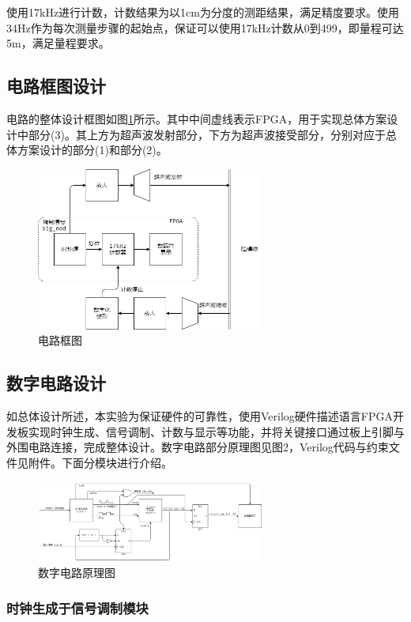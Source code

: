 \documentclass[a4paper, twocolumn]{ctexart}
\begin{document}
使用17kHz进行计数，计数结果为以1cm为分度的测距结果，满足精度要求。使用34Hz作为每次测量步骤的起始点，保证可以使用17kHz计数从0到499，即量程可达5m，满足量程要求。

\subsection{电路框图设计}

电路的整体设计框图如图\ref{fig:block_sch}所示。其中中间虚线表示FPGA，用于实现总体方案设计中部分(3)。其上方为超声波发射部分，下方为超声波接受部分，分别对应于总体方案设计的部分(1)和部分(2)。

\begin{figure}[ht]
    \centering
    \includegraphics[width=7.5cm]{../assets/系统框图.png}
    \caption{电路框图}
    \label{fig:block_sch}
\end{figure}

\subsection{数字电路设计}

如总体设计所述，本实验为保证硬件的可靠性，使用Verilog硬件描述语言FPGA开发板实现时钟生成、信号调制、计数与显示等功能，并将关键接口通过板上引脚与外围电路连接，完成整体设计。数字电路部分原理图见图2，Verilog代码与约束文件见附件。下面分模块进行介绍。

\begin{figure}[ht]
    \centering
    \includegraphics[width=7.5cm]{../assets/数字电路原理图.png}
    \caption{数字电路原理图}
    \label{fig:digital_sch}
\end{figure}

\subsubsection{时钟生成于信号调制模块}
\end{document}
